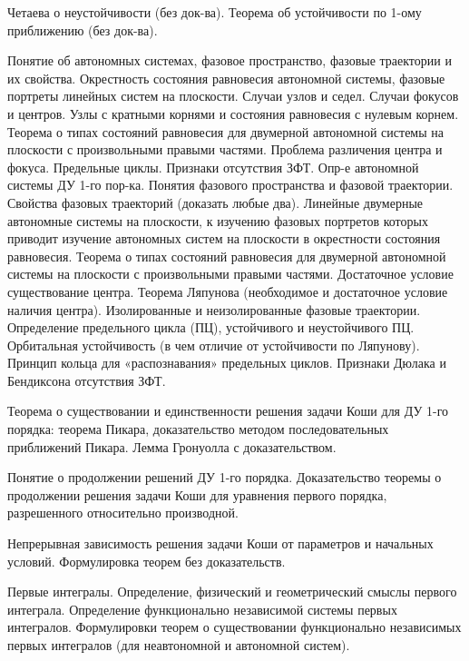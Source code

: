 \documentclass{article}
\newcounter{ticket}[subsection]
\newcounter{Ticket}[subsection]
\newcommand{\Ticket}[1][]{\item[Билет \ifthenelse{\equal{#1}{}}{}{\setcounter{ticket}{#1}}\theticket\refstepcounter{ticket}:]}
\begin{document}
\begin{description}
	Четаева о неустойчивости (без док-ва). Теорема об устойчивости по 1-ому приближению (без док-ва).
	\Ticket Понятие об автономных системах, фазовое пространство, фазовые траектории и их свойства.
	Окрестность состояния равновесия автономной системы, фазовые портреты линейных систем на
	плоскости. Случаи узлов и седел. Случаи фокусов и центров. Узлы с кратными корнями и состояния
	равновесия с нулевым корнем. Теорема о типах состояний равновесия для двумерной автономной
	системы на плоскости с произвольными правыми частями. Проблема различения центра и фокуса.
	Предельные циклы. Признаки отсутствия ЗФТ.
	Опр-е автономной системы ДУ 1-го пор-ка. Понятия фазового пространства и фазовой траектории. Свойства
	фазовых траекторий (доказать любые два). Линейные двумерные автономные системы на плоскости, к
	изучению фазовых портретов которых приводит изучение автономных систем на плоскости в окрестности
	состояния равновесия. Теорема о типах состояний равновесия для двумерной автономной системы на
	плоскости с произвольными правыми частями. Достаточное условие существование центра. Теорема
	Ляпунова (необходимое и достаточное условие наличия центра). Изолированные и неизолированные
	фазовые траектории. Определение предельного цикла (ПЦ), устойчивого и неустойчивого ПЦ. Орбитальная
	устойчивость (в чем отличие от устойчивости по Ляпунову). Принцип кольца для «распознавания»
	предельных циклов. Признаки Дюлака и Бендиксона отсутствия ЗФТ.
	\Ticket Теорема о существовании и единственности решения задачи Коши для ДУ 1-го порядка: теорема
	Пикара, доказательство методом последовательных приближений Пикара. Лемма Гронуолла с
	доказательством.
	\Ticket Понятие о продолжении решений ДУ 1-го порядка. Доказательство теоремы о продолжении
	решения задачи Коши для уравнения первого порядка, разрешенного относительно производной.
	\Ticket Непрерывная зависимость решения задачи Коши от параметров и начальных условий.
	Формулировка теорем без доказательств.
	\Ticket Первые интегралы. Определение, физический и геометрический смыслы первого интеграла.
	Определение функционально независимой системы первых интегралов. Формулировки теорем о
	существовании функционально независимых первых интегралов (для неавтономной и автономной систем).
\end{description}
\end{document}
